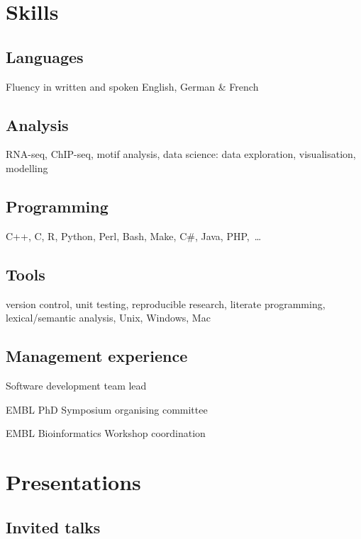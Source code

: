 \documentclass{klmr-cv}
\newcommand*\csharp{C\#}
\newcommand*\cpp{C++}
\begin{document}
\section{Skills}

\subsection{Languages}

\item{Fluency in written and spoken English, German \& French}

\subsection{Analysis}

\item{RNA-seq, ChIP-seq, motif analysis, data science: data exploration,
    visualisation, modelling}

\subsection{Programming}

\item{\cpp, C, R, Python, Perl, Bash, Make, \csharp, Java, PHP,~…}

\subsection{Tools}

\item{version control, unit testing, reproducible research, literate
    programming, lexical/semantic analysis, Unix, Windows, Mac}

\subsection{Management experience}

\item{Software development team lead}
\item{EMBL PhD Symposium organising committee}
\item{EMBL Bioinformatics Workshop coordination}

\section{Presentations}

\subsection{Invited talks}
\end{document}
